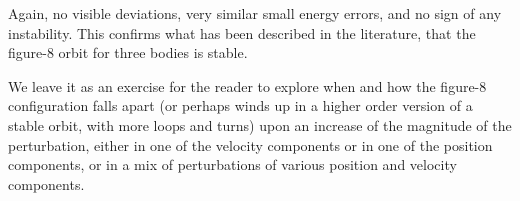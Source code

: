 Again, no visible deviations, very similar small energy errors, and no
sign of any instability.  This confirms what has been described in the
literature, that the figure-8 orbit for three bodies is stable.

We leave it as an exercise for the reader to explore when and how the
figure-8 configuration falls apart (or perhaps winds up in a higher
order version of a stable orbit, with more loops and turns) upon an
increase of the magnitude of the perturbation, either in one of the
velocity components or in one of the position components, or in a mix
of perturbations of various position and velocity components.
